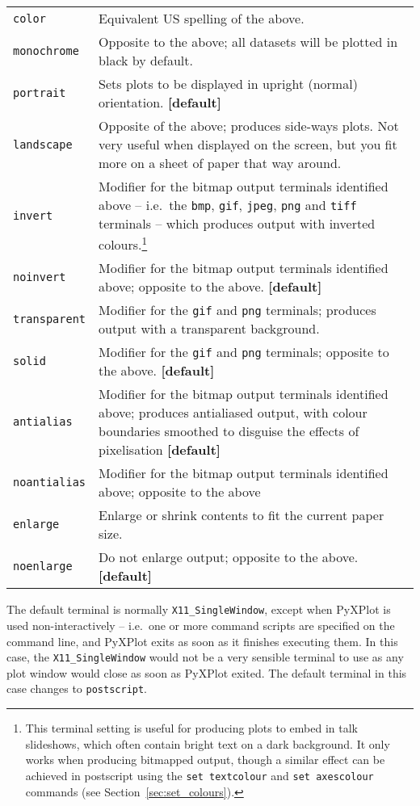 \begin{longtable}{p{3cm}p{9cm}}
{\tt color} & Equivalent US spelling of the above. \\
{\tt monochrome} & Opposite to the above; all datasets will be plotted in black by default.\index{monochrome output}\\
{\tt portrait} & Sets plots to be displayed in upright (normal) orientation. {\bf [default]}\index{portrait orientation}\\
{\tt landscape} & Opposite of the above; produces side-ways plots. Not very useful when displayed on the screen, but you fit more on a sheet of paper that way around.\index{landscape orientation}\\
{\tt invert} & Modifier for the bitmap output terminals identified above -- i.e.\ the {\tt bmp}, {\tt gif}, {\tt jpeg}, {\tt png} and {\tt tiff} terminals -- which produces output with inverted colours.\footnote{This terminal setting is useful for producing plots to embed in talk slideshows, which often contain bright text on a dark background. It only works when producing bitmapped output, though a similar effect can be achieved in postscript using the {\tt set textcolour} and {\tt set axescolour} commands (see Section~\ref{sec:set_colours}).}\index{colours!inverting}\\
{\tt noinvert} & Modifier for the bitmap output terminals identified above; opposite to the above. {\bf [default]}\\
{\tt transparent} & Modifier for the {\tt gif} and {\tt png} terminals; produces output with a transparent background.\index{transparent terminal}\index{gif output!transparency}\index{png output!transparency}\\
{\tt solid} & Modifier for the {\tt gif} and {\tt png} terminals; opposite to the above. {\bf [default]}\\
{\tt antialias} & Modifier for the bitmap output terminals identified above; produces antialiased output, with colour boundaries smoothed to disguise the effects of pixelisation {\bf [default]}\\
{\tt noantialias} & Modifier for the bitmap output terminals identified above; opposite to the above\\
{\tt enlarge} & Enlarge or shrink contents to fit the current paper size.\index{enlarging output}\\
{\tt noenlarge} & Do not enlarge output; opposite to the above. {\bf [default]}\\
\end{longtable}

The default terminal is normally {\tt X11\_SingleWindow}, except when PyXPlot
is used non-interactively -- i.e.\ one or more command scripts are specified on
the command line, and PyXPlot exits as soon as it finishes executing them. In
this case, the {\tt X11\_SingleWindow} would not be a very sensible terminal to
use as any plot window would close as soon as PyXPlot exited. The default
terminal in this case changes to {\tt postscript}.

